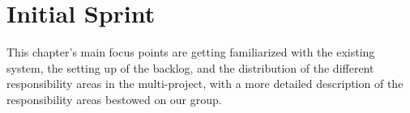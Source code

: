 \chapter{Initial Sprint} \label{cha:Initial_Sprint}
This chapter's main focus points are getting familiarized with the existing system, the setting up of the backlog, and the distribution of the different responsibility areas in the multi-project, with a more detailed description of the responsibility areas bestowed on our group.





 